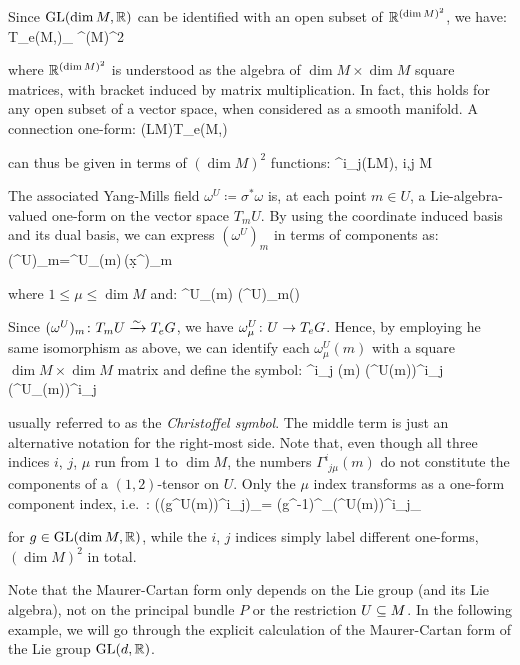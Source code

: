 Since $\operatorname{GL}(\dim M,\mathbb{R})$ can be identified with an open subset of $\mathbb{R}^{(\dim M)^2}$, we have:
\bse
T_e\GL(\dim M,\R)\cong_{} \R^{(\dim M)^2}
\ese

where $\mathbb{R}^{(\dim M)^2}$ is understood as the algebra of $\dim M \times \dim M$ square matrices, with bracket induced
by matrix multiplication. In fact, this holds for any open subset of a vector space, when considered as a smooth
manifold. A connection one-form:
\bse
\omega\cl \Gamma(LM)\xrightarrow{\sim}T_e\GL(\dim M,\R)
\ese

can thus be given in terms of $(\dim M)^2$ functions:
\bse
\omega^i_{\phantom{i}j}\cl \Gamma(LM)\xrightarrow{\sim}\R, \leq i,j \leq \dim M
\ese

The associated Yang-Mills field $\omega^U \coloneqq \sigma^*\omega$ is, at each point $m\in U$, a Lie-algebra-valued
one-form on the vector space $T_m U$. By using the coordinate induced basis and its dual basis, we can express $
(\omega^U)_m$ in terms of components as:
\bse
(\omega^U)_m=\omega^U_\mu(m)\,(\d x^\mu)_m
\ese

where $1\leq \mu \leq \dim M$ and:
\bse
\omega^U_\mu(m) \coloneqq (\omega^U)_m\biggl(\biggr)
\ese

Since $(\omega^U)_m\colon T_m U\xrightarrow{\sim}T_e G$, we have $\omega^U_\mu\colon U \to T_e G$. Hence, by employing he
same isomorphism as above, we can identify each $\omega^U_\mu(m)$ with a square $\dim M \times \dim M$ matrix and
define the symbol:
\bse
\Gamma^i_{\phantom{i}j\mu} (m) \coloneqq (\omega^U(m))^i_{\phantom{i}j\mu} \coloneqq (\omega^U_\mu(m))^i_{\phantom{i}j}
\ese

usually referred to as the \emph{Christoffel symbol}. The middle term is just an alternative notation for the
right-most side. Note that, even though all three indices $i$, $j$, $\mu$ run from $1$ to $\dim M$, the numbers
$\Gamma^i_{\phantom{i}j\mu} (m)$ do not constitute the components of a $(1,2)$-tensor on $U$. Only the $\mu$ index
transforms as a one-form component index, i.e.\ :
\bse
((g\lacts \omega^U(m))^i_{\phantom{i}j})_\mu = (g^{-1})^{\nu}_{\phantom{\mu}}(\omega^U(m))^i_{\phantom{i}j_\nu}
\ese

for $g\in \operatorname{GL}(\dim M,\mathbb{R})$, while the $i$, $j$ indices simply label different one-forms, $(\dim M)^2$ in total.
\ee

Note that the Maurer-Cartan form only depends on the Lie group (and its Lie algebra), not on the principal bundle $P$
or the restriction $U\subseteq M$. In the following example, we will go through the explicit calculation of the
Maurer-Cartan form of the Lie group $\operatorname{GL}(d, \mathbb{R})$.

